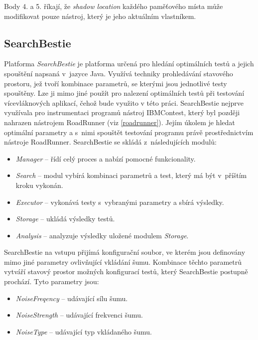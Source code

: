 Body 4. a 5. říkají, že \textit{shadow location} každého paměťového místa může modifikovat pouze nástroj, který je jeho aktuálním vlastníkem.

\subsection{SearchBestie}\label{searchbestie}
Platforma \textit{SearchBestie} \cite{cite:sb} je platforma určená pro hledání optimálních testů a jejich spouštění napsaná v~jazyce Java. Využívá techniky prohledávání stavového prostoru, jež tvoří kombinace parametrů, se kterými jsou jednotlivé testy spouštěny. Lze ji mimo jiné použít pro nalezení optimálních testů při testování vícevláknových aplikací, čehož bude využito v této práci. SearchBestie nejprve využívala pro instrumentaci programů nástroj IBMContest, který byl později nahrazen nástrojem RoadRunner (viz \ref{roadrunner}). Jejím úkolem je hledat optimální parametry a s~nimi spouštět testování programu právě prostřednictvím nástroje RoadRunner. SearchBestie se skládá z~následujících modulů: %

\begin{itemize}
\item \textit{Manager} -- řídí celý proces a nabízí pomocné funkcionality.
\item \textit{Search} -- modul vybírá kombinaci parametrů a test, který má být v~příštím kroku vykonán.
\item \textit{Executor} -- vykonává testy s~vybranými parametry a sbírá výsledky.
\item \textit{Storage} -- ukládá výsledky testů.
\item \textit{Analysis} -- analyzuje výsledky uložené modulem \textit{Storage}.
\end{itemize}

SearchBestie na vstupu přijímá konfigurační soubor, ve kterém jsou definovány mimo jiné parametry ovlivňující vkládání šumu. Kombinace těchto parametrů vytváří stavový prostor možných konfigurací testů, který SearchBestie postupně prochází. Tyto parametry jsou:

\begin{itemize}
\item \textit{NoiseFreqency} -- udávající sílu šumu.
\item \textit{NoiseStrength} -- udávající frekvenci šumu.
\item \textit{NoiseType} -- udávající typ vkládaného šumu.
\end{itemize}

